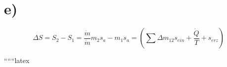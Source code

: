 

\section*{e)}
\[
\Delta S = S_2 - S_1 = \frac{\dot{m}}{\dot{m}} m_2 s_a - m_1 s_a = \left( \sum \Delta m_{12} s_{ein} + \frac{\dot{Q}}{T} + s_{erz} \right)
\]

``````latex